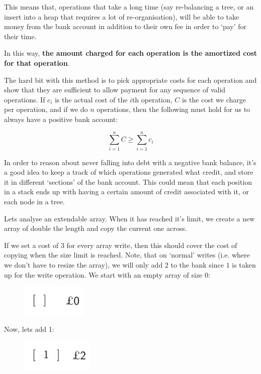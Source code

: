 This means that, operations that take a long time (say re-balancing a tree, or
an insert into a heap that requires a lot of re-organisation), will be able to
take money from the bank account in addition to their own fee in order to `pay'
for their time.

In this way, \textbf{the amount charged for each operation is the amortized cost
for that operation}.

The hard bit with this method is to pick appropriate costs for each operation
and show that they are sufficient to allow payment for any sequence of valid
operations. If $c_i$ is the actual cost of the $i$th operation, $C$ is the cost
we charge per operation, and if we do $n$ operations, then the following must
hold for us to always have a positive bank account:

\[
  \sum\limits_{i = 1}^nC \geq \sum\limits_{i=1}^nc_i
\]

In order to reason about never falling into debt with a negative bank balance,
it's a good idea to keep a track of which operations generated what credit, and
store it in different `sections' of the bank account. This could mean that each
position in a stack ends up with having a certain amount of credit associated
with it, or each node in a tree.

Lets analyse an extendable array. When it has reached it's limit, we create a
new array of double the length and copy the current one across.

If we set a cost of $3$ for every array write, then this should cover the cost
of copying when the size limit is reached. Note, that on `normal' writes (i.e.
where we don't have to resize the array), we will only add \textsterling$2$ to
the bank since \textsterling $1$ is taken up for the write operation. We start
with an empty array of size 0:

\begin{figure}[H]
  \centering
  \includegraphics[height=15mm]{diagrams/banker0.pdf}
  \label{banker0}
\end{figure}

Now, lets add 1:

\begin{figure}[H]
  \centering
  \includegraphics[height=15mm]{diagrams/banker1.pdf}
  \label{banker1}
\end{figure}


